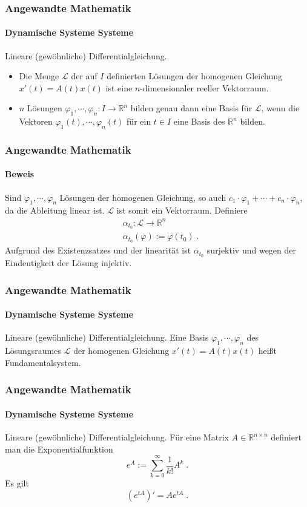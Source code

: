 \documentclass{beamer}
\begin{document}
\begin{frame}
    \frametitle{Angewandte Mathematik}
\framesubtitle{Dynamische Systeme Systeme}
\begin{block}{Lineare (gewöhnliche) Differentialgleichung.}
\begin{itemize}
\item Die Menge $\mathcal{L}$ der auf $I$ definierten Lösungen der homogenen Gleichung $x'(t) = A(t)x(t)$ ist eine $n$-dimensionaler reeller Vektorraum.
\item $n$ Lösungen $\varphi_1, \cdots, \varphi_n : I \to \mathbb{R}^n$ bilden genau dann eine Basis für $\mathcal{L}$, wenn die Vektoren $\varphi_1(t), \cdots, \varphi_n(t)$ für ein $t \in I$ eine Basis des $\mathbb{R}^n$ bilden.
\end{itemize}
\end{block}

 \end{frame}


\begin{frame}
    \frametitle{Angewandte Mathematik}
\framesubtitle{Beweis}
Sind  $\varphi_1, \cdots, \varphi_n$ Lösungen der homogenen Gleichung, so auch $ c_1 \cdot \varphi_1 + \cdots + c_n \cdot \varphi_n$, da die Ableitung linear ist.
$\mathcal{L}$ ist somit ein Vektorraum. Definiere 
\begin{align*}
& \alpha_{t_0} : \mathcal{L} \to \mathbb{R}^n \\
& \alpha_{t_0} (\varphi) := \varphi(t_0) \; .
\end{align*} 
Aufgrund des Existenzsatzes und der linearität ist $ \alpha_{t_0}$ surjektiv und wegen der Eindeutigkeit der Lösung injektiv.
 \end{frame}


\begin{frame}
    \frametitle{Angewandte Mathematik}
\framesubtitle{Dynamische Systeme Systeme}
\begin{block}{Lineare (gewöhnliche) Differentialgleichung.}
Eine Basis  $\varphi_1, \cdots, \varphi_n$ des Lösungsraumes $\mathcal{L}$ der homogenen Gleichung $x'(t) = A(t)x(t)$ heißt Fundamentalsystem.
\end{block}

 \end{frame}

\begin{frame}
    \frametitle{Angewandte Mathematik}
\framesubtitle{Dynamische Systeme Systeme}
\begin{block}{Lineare (gewöhnliche) Differentialgleichung.}
Für eine Matrix $A \in \mathbb{R}^{n \times n}$ definiert man die Exponentialfunktion 
$$  e^{ A}  := \sum_{k= 0}^{\infty} \frac{1}{k!} A^k \; .$$
Es gilt  
$$  (e^{ tA})' = A e^{tA}  \; .$$
\end{block}

 \end{frame}
\end{document}
